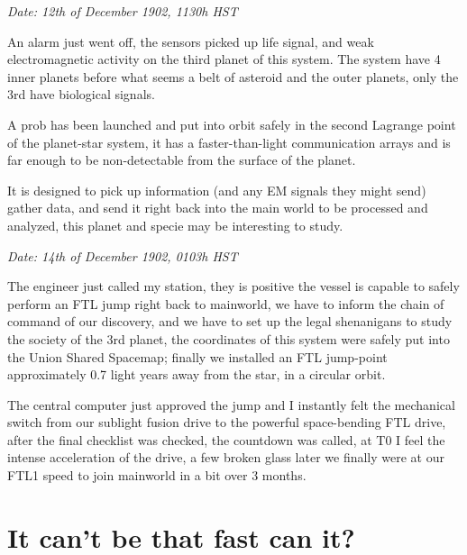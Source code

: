 \documentclass[colorlinks,12pt,a4paper]{book}
\begin{document}
\textit{Date: 12th of December 1902, 1130h HST}\par

An alarm just went off, 
the sensors picked up life signal, and weak electromagnetic activity on the third planet of this system. 
The system have 4 inner planets before what seems a belt of asteroid and the outer planets, 
only the 3rd have biological signals. \par
\bigskip

A prob has been launched and put into orbit safely in the second Lagrange point of the planet-star system,
 it has a faster-than-light communication arrays and is far enough to be non-detectable from the surface of the planet. \par
\bigskip
It is designed to pick up information 
(and any EM signals they might send) gather data, and send it right back into the main world to be processed and analyzed, 
this planet and specie may be interesting to study.\par
\bigskip

\textit{Date: 14th of December 1902, 0103h HST}\par

The engineer just called my station, 
they is positive the vessel is capable to safely perform an FTL jump right back to mainworld, 
we have to inform the chain of command of our discovery, and we have to set up the legal shenanigans 
to study the society of the 3rd planet, the coordinates of this system were safely put into the Union Shared Spacemap;
finally we installed an FTL jump-point approximately 0.7 light years away from the star, in a circular orbit.\par
\bigskip

The central computer just approved the jump and I instantly felt the mechanical switch 
from our sublight fusion drive to the powerful space-bending FTL drive, 
after the final checklist was checked, the countdown was called, at T0 I feel the intense acceleration of the drive, 
a few broken glass later we finally were at our FTL1 speed to join mainworld in a bit over 3 months.\par


\chapter{It can't be that fast can it?}
\end{document}
